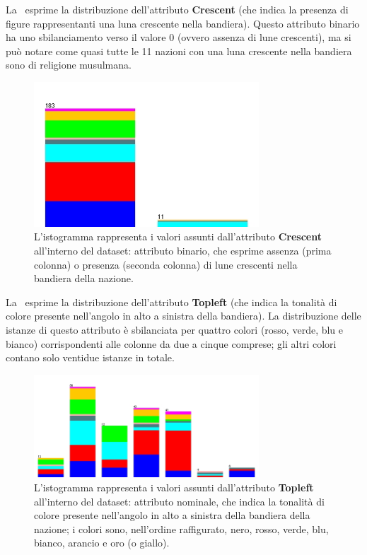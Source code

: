 \documentclass[a4paper,11pt,twoside,notitlepage,final]{scrartcl}
\begin{document}
La~ esprime la distribuzione dell'attributo \textbf{Crescent} (che indica la presenza di figure rappresentanti una luna crescente nella bandiera).
Questo attributo binario ha uno sbilanciamento verso il valore 0 (ovvero assenza di lune crescenti), ma si può notare come quasi tutte le 11 nazioni con
una luna crescente nella bandiera sono di religione musulmana.

\begin{figure}[H]
  \centering
  \includegraphics[width=0.75\textwidth]{fig/religion-crescent.jpg}%
  \caption{%
    L'istogramma rappresenta i valori assunti dall'attributo \textbf{Crescent}
    all'interno del dataset: attributo binario, che esprime assenza (prima colonna) o presenza (seconda colonna) di lune crescenti nella bandiera della nazione.
    }%
  \label{fig:crescent}
\end{figure}

La~ esprime la distribuzione dell'attributo \textbf{Topleft} (che indica la tonalità di colore presente nell'angolo in alto a sinistra della bandiera).
La distribuzione delle istanze di questo attributo è sbilanciata per quattro colori (rosso, verde, blu e bianco) corrispondenti alle colonne da due a cinque comprese; gli altri colori contano solo ventidue istanze in totale.

\begin{figure}[H]
  \centering
  \includegraphics[width=0.75\textwidth]{fig/religion-topleft.jpg}%
  \caption{%
    L'istogramma rappresenta i valori assunti dall'attributo \textbf{Topleft}
    all'interno del dataset: attributo nominale, che indica la tonalità di colore presente nell'angolo in alto a sinistra della bandiera della nazione;
    i colori sono, nell'ordine raffigurato, nero, rosso, verde, blu, bianco, arancio e oro (o giallo).
    }%
  \label{fig:topleft}
\end{figure}
\end{document}
